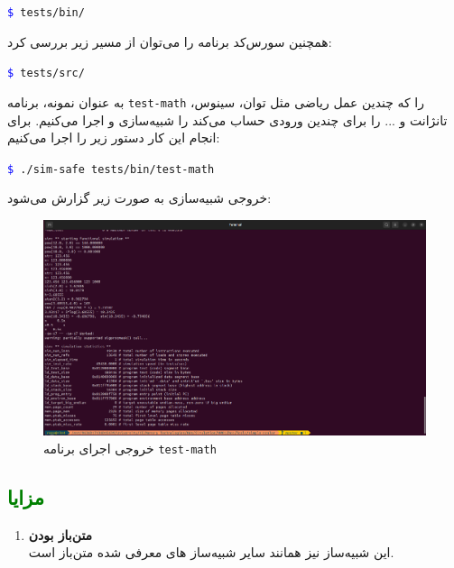 \documentclass[12pt]{exam}
\begin{document}
\begin{questions}
\begin{latin}
	\texttt{\textcolor{blue}{\$} tests/bin/} \\
\end{latin}

همچنین سورس‌کد برنامه را می‌توان از مسیر زیر بررسی کرد:

\begin{latin}
	\texttt{\textcolor{blue}{\$} tests/src/} \\
\end{latin}

به عنوان نمونه، برنامه \texttt{test-math} را که چندین عمل ریاضی مثل توان، سینوس، تانژانت و ... را برای چندین ورودی حساب می‌کند را شبیه‌سازی و اجرا می‌کنیم. برای انجام این کار دستور زیر را اجرا می‌کنیم: \\

\begin{latin}
	\texttt{\textcolor{blue}{\$} ./sim-safe tests/bin/test-math} \\
\end{latin}

خروجی شبیه‌سازی به صورت زیر گزارش می‌شود: \newpage

\begin{figure}[h]
	\centering
	\includegraphics[width=1\textwidth]{images/img18}
	\caption{خروجی اجرای برنامه \texttt{test-math}}
	\label{خروجی اجرای برنامه test-math}
\end{figure}


 
 
 
 \subsection{\textcolor{green}{مزایا}}
 \begin{enumerate}
 	\item \textbf{متن‌باز بودن}\\
 	این شبیه‌ساز نیز همانند سایر شبیه‌ساز های معرفی شده متن‌باز است.
 	

\end{enumerate}
\end{questions}
\end{document}
